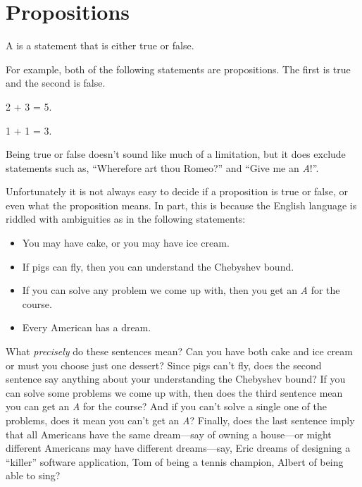 \chapter{Propositions}\label{prop_chap}

\begin{definition*}
A  is a statement that is either true or false.
\end{definition*}

For example, both of the following statements are propositions.  The
first is true and the second is false.
\begin{proposition}
2 + 3 = 5.
\end{proposition}
\begin{proposition}
1 + 1 = 3.
\end{proposition}
Being true or false doesn't sound like much of a limitation, but it
does exclude statements such as, ``Wherefore art thou Romeo?'' and
``Give me an \emph{A}!''.

Unfortunately it is not always easy to decide if a proposition is true
or false, or even what the proposition means.  In part, this is
because the English language is riddled with ambiguities as in
 the following statements:
%

\begin{itemize}
\item You may have cake, or you may have ice cream. 
\item If pigs can fly, then you can understand the Chebyshev bound.
\item If you can solve any problem we come up with, then you get an
  \emph{A} for the course.
\item Every American has a dream.
\end{itemize}
%
What \emph{precisely} do these sentences mean?  Can you have both cake and
ice cream or must you choose just one dessert?  Since pigs can't fly, does
the second sentence say anything about your understanding the Chebyshev
bound?  If you can solve some problems we come up with, then does the
third sentence mean you can get an \emph{A} for the course?  And if you
can't solve a single one of the problems, does it mean you can't get an
\emph{A}?  Finally, does the last sentence imply that all Americans have
the same dream---say of owning a house---or might different Americans may
have different dreams---say, Eric dreams of designing a ``killer''
software application, Tom of being a tennis champion, Albert of being able
to sing?

